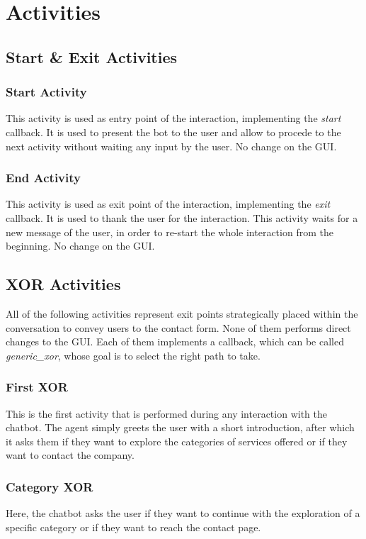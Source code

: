 \documentclass[12pt]{report}
\begin{document}
\chapter{Activities}
\section{Start \& Exit Activities}
\subsection{Start Activity}
This activity is used as entry point of the interaction, implementing the 
\emph{start} callback. It is used to present the bot to the user and allow to
procede to the next activity without waiting any input by the user. 
No change on the GUI.
\subsection{End Activity}
This activity is used as exit point of the interaction, implementing the 
\emph{exit} callback. It is used to thank the user for the interaction. 
This activity waits for a new message of the user, in order to re-start the whole 
interaction from the beginning. No change on the GUI.
\section{XOR Activities}
All of the following activities represent exit points strategically placed
within the conversation to convey users to the contact form.
None of them performs direct changes to the GUI. Each of them implements a callback,
which can be called \emph{generic\_xor}, whose goal is to select the right path to take.

\subsection{First XOR}
This is the first activity that is performed during any interaction with
the chatbot. The agent simply greets the user with a short introduction,
after which it asks them if they want to explore the categories of services
offered or if they want to contact the company.

\subsection{Category XOR}
Here, the chatbot asks the user if they want to continue with the exploration 
of a specific category or if they want to reach the contact page.
\end{document}
